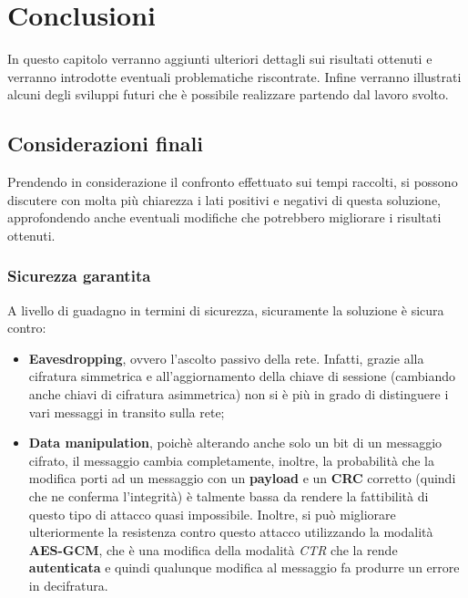 \chapter{Conclusioni} %
%

\begin{citazione}
	In questo capitolo verranno aggiunti ulteriori dettagli sui risultati ottenuti e verranno introdotte eventuali problematiche riscontrate. Infine verranno illustrati alcuni degli sviluppi futuri che è possibile realizzare partendo dal lavoro svolto.
\end{citazione}

\section{Considerazioni finali}
Prendendo in considerazione il confronto effettuato sui tempi raccolti, si possono discutere con molta più chiarezza i lati positivi e negativi di questa soluzione, approfondendo anche eventuali modifiche che potrebbero migliorare i risultati ottenuti.

\subsection{Sicurezza garantita}
A livello di guadagno in termini di sicurezza, sicuramente la soluzione è sicura contro: 
\begin{itemize}
	\item \textbf{Eavesdropping}, ovvero l'ascolto passivo della rete. Infatti, grazie alla cifratura simmetrica e all'aggiornamento della chiave di sessione (cambiando anche chiavi di cifratura asimmetrica) non si è più in grado di distinguere i vari messaggi in transito sulla rete;
	\item \textbf{Data manipulation}, poichè alterando anche solo un bit di un messaggio cifrato, il messaggio cambia completamente, inoltre, la probabilità che la modifica porti ad un messaggio con un \textbf{payload} e un \textbf{CRC} corretto (quindi che ne conferma l'integrità) è talmente bassa da rendere la fattibilità di questo tipo di attacco quasi impossibile. Inoltre, si può migliorare ulteriormente la resistenza contro questo attacco utilizzando la modalità \textbf{AES-GCM}, che è una modifica della modalità \emph{CTR} che la rende \textbf{autenticata} e quindi qualunque modifica al messaggio fa produrre un errore in decifratura. \cite{wikipedia_gcm}
\end{itemize}

